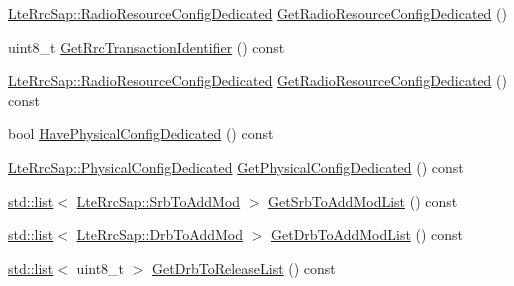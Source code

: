 \begin{DoxyCompactItemize}
\item 
\hyperlink{structns3_1_1LteRrcSap_1_1RadioResourceConfigDedicated}{Lte\+Rrc\+Sap\+::\+Radio\+Resource\+Config\+Dedicated} \hyperlink{classns3_1_1RrcConnectionReconfigurationHeader_a5a6c31ff3039aac1fa8891855f7b7bb3}{Get\+Radio\+Resource\+Config\+Dedicated} ()
\item 
uint8\+\_\+t \hyperlink{classns3_1_1RrcConnectionReconfigurationHeader_a29a5f14b0b2d862c4ea33cca60bab10e}{Get\+Rrc\+Transaction\+Identifier} () const 
\item 
\hyperlink{structns3_1_1LteRrcSap_1_1RadioResourceConfigDedicated}{Lte\+Rrc\+Sap\+::\+Radio\+Resource\+Config\+Dedicated} \hyperlink{classns3_1_1RrcConnectionReconfigurationHeader_a9fa3593c4dad3028a0fa3883849b5b28}{Get\+Radio\+Resource\+Config\+Dedicated} () const 
\item 
bool \hyperlink{classns3_1_1RrcConnectionReconfigurationHeader_acd49857688b49853c8a591514e87a76e}{Have\+Physical\+Config\+Dedicated} () const 
\item 
\hyperlink{structns3_1_1LteRrcSap_1_1PhysicalConfigDedicated}{Lte\+Rrc\+Sap\+::\+Physical\+Config\+Dedicated} \hyperlink{classns3_1_1RrcConnectionReconfigurationHeader_ae0ef1a79d7338473387e84c4456876cf}{Get\+Physical\+Config\+Dedicated} () const 
\item 
\hyperlink{openflow-interface_8h_afd9bcfa176617760671b67580f536fa7}{std\+::list}$<$ \hyperlink{structns3_1_1LteRrcSap_1_1SrbToAddMod}{Lte\+Rrc\+Sap\+::\+Srb\+To\+Add\+Mod} $>$ \hyperlink{classns3_1_1RrcConnectionReconfigurationHeader_a948e6f07d5d507a6e3689d3819e75d65}{Get\+Srb\+To\+Add\+Mod\+List} () const 
\item 
\hyperlink{openflow-interface_8h_afd9bcfa176617760671b67580f536fa7}{std\+::list}$<$ \hyperlink{structns3_1_1LteRrcSap_1_1DrbToAddMod}{Lte\+Rrc\+Sap\+::\+Drb\+To\+Add\+Mod} $>$ \hyperlink{classns3_1_1RrcConnectionReconfigurationHeader_a70008c0db3e7ec3ed4c2feb26f33059c}{Get\+Drb\+To\+Add\+Mod\+List} () const 
\item 
\hyperlink{openflow-interface_8h_afd9bcfa176617760671b67580f536fa7}{std\+::list}$<$ uint8\+\_\+t $>$ \hyperlink{classns3_1_1RrcConnectionReconfigurationHeader_a5026ee7a8413d1f531c882967cbfc6b3}{Get\+Drb\+To\+Release\+List} () const 
\end{DoxyCompactItemize}
